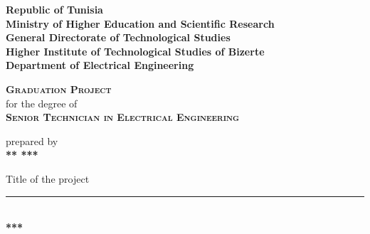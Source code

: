 \begin{titlepage}
    \newcommand{\HRule}{\rule{\linewidth}{0.35mm}}
    \begin{flushleft}
          {\scriptsize
            \textbf{\large{Republic of Tunisia}}\\
            \textbf{\large{Ministry of Higher Education and Scientific Research}}\\
            \textbf{\large{General Directorate of Technological Studies}}\\
            \textbf{\large{Higher Institute of Technological Studies of Bizerte}}\\
            \textbf{\large{Department of Electrical Engineering}}}
    \end{flushleft}
    \begin{center}
        \textbf{\textsc{\huge{Graduation Project}}}\\
        for the degree of \\
        \textbf{\textsc{\large{Senior Technician in Electrical Engineering}}}\\
    \end{center}
    \begin{center}
        prepared by\\
        \textbf{{\large *** \textsc{***}}}\\
    \end{center}
    \begin{center}
        Title of the project\\
        \HRule \\[0.3cm]
        \Huge{\textbf{***}}\\[0.2cm]

\end{center}
\end{titlepage}
